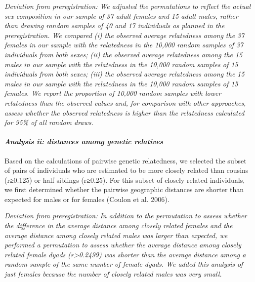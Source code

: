 \documentclass[]{article}
\let\oldparagraph\paragraph
\renewcommand{\paragraph}[1]{\oldparagraph{#1}\mbox{}}
\begin{document}
\emph{Deviation from preregistration: We adjusted the permutations to
reflect the actual sex composition in our sample of 37 adult females and
15 adult males, rather than drawing random samples of 40 and 17
individuals as planned in the preregistration. We compared (i) the
observed average relatedness among the 37 females in our sample with the
relatedness in the 10,000 random samples of 37 individuals from both
sexes; (ii) the observed average relatedness among the 15 males in our
sample with the relatedness in the 10,000 random samples of 15
individuals from both sexes; (iii) the observed average relatedness
among the 15 males in our sample with the relatedness in the 10,000
random samples of 15 females. We report the proportion of 10,000 random
samples with lower relatedness than the observed values and, for
comparison with other approaches, assess whether the observed
relatedness is higher than the relatedness calculated for 95\% of all
random draws.}

\hypertarget{analysis-ii-distances-among-genetic-relatives}{%
\paragraph{\texorpdfstring{\emph{Analysis ii: distances among genetic
relatives}}{Analysis ii: distances among genetic relatives}}\label{analysis-ii-distances-among-genetic-relatives}}

Based on the calculations of pairwise genetic relatedness, we selected
the subset of pairs of individuals who are estimated to be more closely
related than cousins (r≥0.125) or half-siblings (r≥0.25). For this
subset of closely related individuals, we first determined whether the
pairwise geographic distances are shorter than expected for males or for
females (Coulon et al. 2006).

\emph{Deviation from preregistration: In addition to the permutation to
assess whether the difference in the average distance among closely
related females and the average distance among closely related males was
larger than expected, we performed a permutation to assess whether the
average distance among closely related female dyads
(r\textgreater{}0.2499) was shorter than the average distance among a
random sample of the same number of female dyads. We added this analysis
of just females because the number of closely related males was very
small.}
\end{document}
